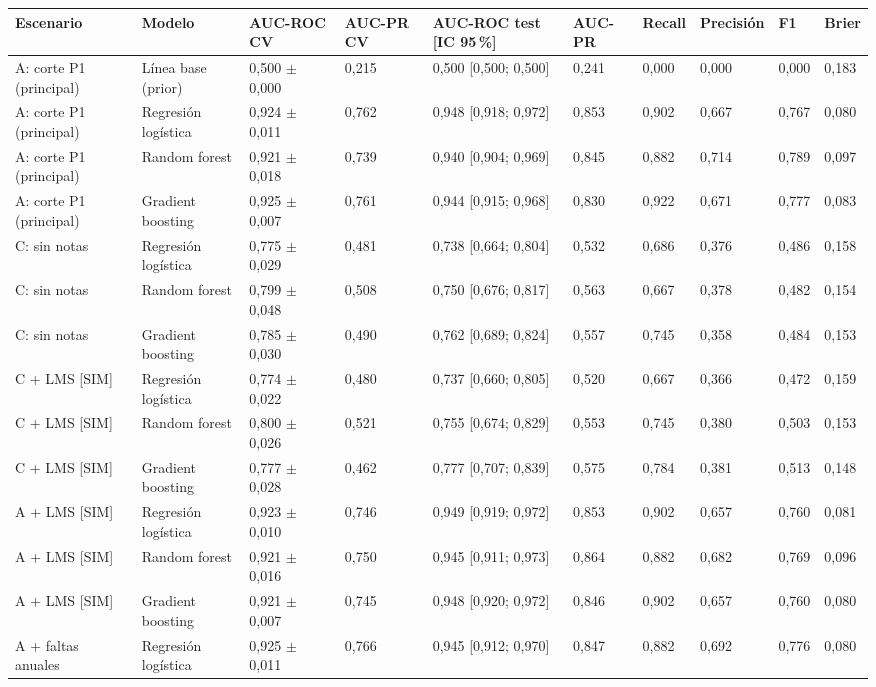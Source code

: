 \begin{tabular}{llllllllll}
\toprule
Escenario & Modelo & AUC-ROC CV & AUC-PR CV & AUC-ROC test [IC 95\,\%] & AUC-PR & Recall & Precisión & F1 & Brier \\
\midrule
A: corte P1 (principal) & Línea base (prior) & 0,500 $\pm$ 0,000 & 0,215 & 0,500 [0,500; 0,500] & 0,241 & 0,000 & 0,000 & 0,000 & 0,183 \\
A: corte P1 (principal) & Regresión logística & 0,924 $\pm$ 0,011 & 0,762 & 0,948 [0,918; 0,972] & 0,853 & 0,902 & 0,667 & 0,767 & 0,080 \\
A: corte P1 (principal) & Random forest & 0,921 $\pm$ 0,018 & 0,739 & 0,940 [0,904; 0,969] & 0,845 & 0,882 & 0,714 & 0,789 & 0,097 \\
A: corte P1 (principal) & Gradient boosting & 0,925 $\pm$ 0,007 & 0,761 & 0,944 [0,915; 0,968] & 0,830 & 0,922 & 0,671 & 0,777 & 0,083 \\
C: sin notas & Regresión logística & 0,775 $\pm$ 0,029 & 0,481 & 0,738 [0,664; 0,804] & 0,532 & 0,686 & 0,376 & 0,486 & 0,158 \\
C: sin notas & Random forest & 0,799 $\pm$ 0,048 & 0,508 & 0,750 [0,676; 0,817] & 0,563 & 0,667 & 0,378 & 0,482 & 0,154 \\
C: sin notas & Gradient boosting & 0,785 $\pm$ 0,030 & 0,490 & 0,762 [0,689; 0,824] & 0,557 & 0,745 & 0,358 & 0,484 & 0,153 \\
C + LMS [SIM] & Regresión logística & 0,774 $\pm$ 0,022 & 0,480 & 0,737 [0,660; 0,805] & 0,520 & 0,667 & 0,366 & 0,472 & 0,159 \\
C + LMS [SIM] & Random forest & 0,800 $\pm$ 0,026 & 0,521 & 0,755 [0,674; 0,829] & 0,553 & 0,745 & 0,380 & 0,503 & 0,153 \\
C + LMS [SIM] & Gradient boosting & 0,777 $\pm$ 0,028 & 0,462 & 0,777 [0,707; 0,839] & 0,575 & 0,784 & 0,381 & 0,513 & 0,148 \\
A + LMS [SIM] & Regresión logística & 0,923 $\pm$ 0,010 & 0,746 & 0,949 [0,919; 0,972] & 0,853 & 0,902 & 0,657 & 0,760 & 0,081 \\
A + LMS [SIM] & Random forest & 0,921 $\pm$ 0,016 & 0,750 & 0,945 [0,911; 0,973] & 0,864 & 0,882 & 0,682 & 0,769 & 0,096 \\
A + LMS [SIM] & Gradient boosting & 0,921 $\pm$ 0,007 & 0,745 & 0,948 [0,920; 0,972] & 0,846 & 0,902 & 0,657 & 0,760 & 0,080 \\
A + faltas anuales & Regresión logística & 0,925 $\pm$ 0,011 & 0,766 & 0,945 [0,912; 0,970] & 0,847 & 0,882 & 0,692 & 0,776 & 0,080 \\

\end{tabular}
